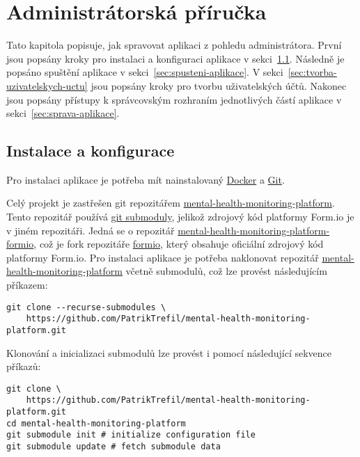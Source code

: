 \chapter{Administrátorská příručka}\label{ch:administratorska-prirucka}

Tato kapitola popisuje, jak spravovat aplikaci z pohledu administrátora.
První jsou popsány kroky pro instalaci a konfiguraci aplikace v sekci~\ref{sec:instalace}.
Následně je popsáno spuštění aplikace v sekci~\ref{sec:spusteni-aplikace}.
V sekci~\ref{sec:tvorba-uzivatelskych-uctu} jsou popsány kroky pro tvorbu uživatelských účtů.
Nakonec jsou popsány přístupy k správcovským rozhraním jednotlivých částí aplikace v sekci~\ref{sec:sprava-aplikace}.


\section{Instalace a konfigurace}\label{sec:instalace}

Pro instalaci aplikace je potřeba mít nainstalovaný \href{https://www.docker.com/}{Docker} a \href{https://git-scm.com/}{Git}.

Celý projekt je zastřešen git repozitářem \href{https://github.com/PatrikTrefil/mental-health-monitoring-platform.git}{mental-health-monitoring-platform}.
Tento repozitář používá \href{https://git-scm.com/book/en/v2/Git-Tools-Submodules}{git submoduly}, jelikož zdrojový kód platformy Form.io je v jiném repozitáři.
Jedná se o repozitář \href{https://github.com/PatrikTrefil/mental-health-monitoring-platform-formio}{mental-health-monitoring-platform-formio}, což je fork repozitáře \href{https://github.com/formio/formio}{formio}, který obsahuje oficiální zdrojový kód platformy Form.io.
Pro instalaci aplikace je potřeba naklonovat repozitář \href{https://github.com/PatrikTrefil/mental-health-monitoring-platform.git}{mental-health-monitoring-platform} včetně submodulů, což lze provést následujícím příkazem:

\begin{verbatim}
git clone --recurse-submodules \
    https://github.com/PatrikTrefil/mental-health-monitoring-platform.git
\end{verbatim}

Klonování a inicializaci submodulů lze provést i pomocí následující sekvence příkazů:

\begin{verbatim}
git clone \
    https://github.com/PatrikTrefil/mental-health-monitoring-platform.git
cd mental-health-monitoring-platform
git submodule init # initialize configuration file
git submodule update # fetch submodule data
\end{verbatim}

